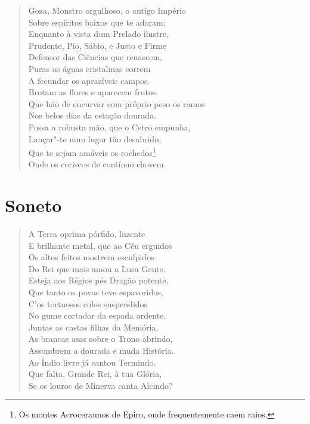 \begin{verse}
Goza, Monstro orgulhoso, o antigo Império\\
Sobre espíritos baixos que te adoram;\\
Enquanto à vista dum Prelado ilustre,\\
Prudente, Pio, Sábio, e Justo e Firme\\ %
Defensor das Ciências que renascem,\\
Puras as águas cristalinas correm\\
A fecundar os aprazíveis campos.\\
Brotam as flores e aparecem frutos.\\
Que hão de encurvar com próprio peso os \qb{}ramos\\
Nos belos dias da estação dourada.\\
Possa a robusta mão, que o Cetro empunha,\\
Lançar"-te num lugar tão desabrido,\\
Que te sejam amáveis os rochedos\footnote{ Os montes Acroceraunos de
Epiro, onde frequentemente caem raios.}\\
Onde os coriscos de contínuo chovem. \\[10pt]
\end{verse}

\pagebreak

\chapter{Soneto}

\begin{verse}


A Terra oprima pórfido, luzente\\		\index{\Porf}
E brilhante metal, que ao Céu erguidos\\
Os altos feitos mostrem esculpidos\\
Do Rei que mais amou a Lusa Gente. \\[10pt]


Esteja aos Régios pés Dragão potente,\\
Que tanto os povos teve espavoridos,\\
C'os tortuosos colos suspendidos\\
No gume cortador da espada ardente. \\[10pt]


Juntas as castas filhas da Memória,\\		\index{\Filmemo}
As brancas asas sobre o Trono abrindo,\\
Assombrem a dourada e muda História. \\[10pt]


Ao Índio livre já cantou Termindo.\\		\index{\Termin}
Que falta, Grande Rei, à tua Glória,\\
Se os louros de Minerva canta Alcindo? \\[10pt]		\index{\Lour}		\index{\Miner}

\vspace*{2em}
\end{verse}

